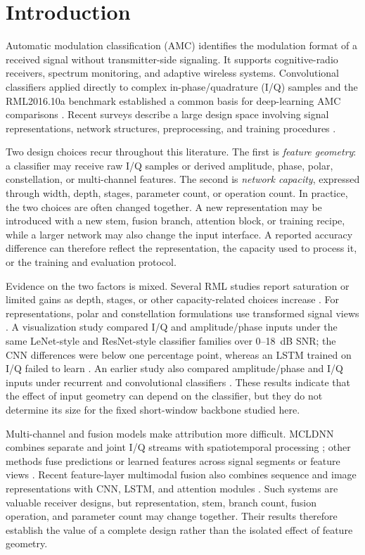 \section{Introduction}
\label{sec:introduction}
Automatic modulation classification (AMC) identifies the modulation format of a
received signal without transmitter-side signaling. It supports cognitive-radio
receivers, spectrum monitoring, and adaptive wireless systems. Convolutional
classifiers applied directly to complex in-phase/quadrature (I/Q) samples and
the RML2016.10a benchmark established a common basis for deep-learning AMC
comparisons \cite{OShea2016Dataset,OShea2016CRR}. Recent surveys describe a
large design space involving signal representations, network structures,
preprocessing, and training procedures \cite{Peng2022Survey,Zhang2022DLAMR,
HuynhThe2021Survey}.

Two design choices recur throughout this literature. The first is \emph{feature
geometry}: a classifier may receive raw I/Q samples or derived amplitude,
phase, polar, constellation, or multi-channel features. The second is
\emph{network capacity}, expressed through width, depth, stages, parameter
count, or operation count. In practice, the two choices are often changed
together. A new representation may be introduced with a new stem, fusion
branch, attention block, or training recipe, while a larger network may also
change the input interface. A reported accuracy difference can therefore
reflect the representation, the capacity used to process it, or the training
and evaluation protocol.

Evidence on the two factors is mixed. Several RML studies report saturation or
limited gains as depth, stages, or other capacity-related choices increase
\cite{West2017Deep,Chen2022SigNet,Harper2023AMC}. For representations, polar
and constellation formulations use transformed signal views
\cite{Peng2019Constellation,Teng2018Polar,Teng2020Polar}. A visualization
study compared I/Q and amplitude/phase inputs under the same LeNet-style and
ResNet-style classifier families over 0--18~dB SNR; the CNN differences were
below one percentage point, whereas an LSTM trained on I/Q failed to learn
\cite{Huang2021Visualizing}. An earlier study also compared amplitude/phase
and I/Q inputs under recurrent and convolutional classifiers
\cite{Rajendran2018Deep}. These results indicate that the effect of input
geometry can depend on the classifier, but they do not determine its size for
the fixed short-window backbone studied here.

Multi-channel and fusion models make attribution more difficult. MCLDNN
combines separate and joint I/Q streams with spatiotemporal processing
\cite{Xu2020MCLDNN}; other methods fuse predictions or learned features across
signal segments or feature views \cite{Zheng2019Fusion,Li2023LightMFFS}.
Recent feature-layer multimodal fusion also combines sequence and image
representations with CNN, LSTM, and attention modules \cite{Wang2024AMFN}.
Such systems are valuable receiver designs, but representation, stem, branch
count, fusion operation, and parameter count may change together. Their results
therefore establish the value of a complete design rather than the isolated
effect of feature geometry.

